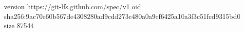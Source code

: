 version https://git-lfs.github.com/spec/v1
oid sha256:9ac70e60b567de4308280ad9cdd273c480a0a9cf6425a10a3f3c51fed9315bd0
size 87544
